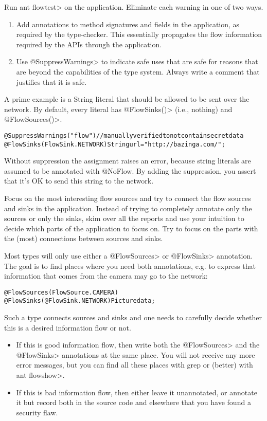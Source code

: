 Run \<ant flowtest> on the application.
Eliminate each warning in one of two ways.
\begin{enumerate}
\item Add annotations to method signatures and fields in the application, as
required by the type-checker. This essentially propagates the flow
information required by the APIs through the application.

\item Use \<@SuppressWarnings> to indicate safe uses that are safe for reasons
that are beyond the capabilities of the type system. Always write a
comment that justifies that it is safe.
\end{enumerate}
A prime example is a String literal that should be allowed to be sent
over the network. By default, every literal has \<@FlowSinks()>
(i.e., nothing) and \<@FlowSources()>.

\begin{alltt}
    @SuppressWarnings("flow") // manually verified to not contain secret data
    @FlowSinks(FlowSink.NETWORK) String url = "http://bazinga.com/";
\end{alltt}

\noindent
Without suppression the assignment raises an error, because string literals
are assumed to be annotated with @NoFlow. By adding the suppression, you
assert that it's OK to send this string to the network. 

Focus on the most interesting flow sources and try to connect the flow
sources and sinks in the application. Instead of trying to completely
annotate only the sources or only the sinks, skim over all the reports
and use your intuition to decide which parts of the application to
focus on. Try to focus on the parts with the (most) connections
between sources and sinks.

Most types will only use either a \<@FlowSources> or \<@FlowSinks>
annotation.
The goal is to find places where you need both annotations, e.g. to
express that information that comes from the camera may go to the
network:

\begin{alltt}
    @FlowSources(FlowSource.CAMERA)
    @FlowSinks(@FlowSink.NETWORK) Picture data;
\end{alltt}

Such a type connects sources and sinks and one needs to carefully
decide whether this is a desired information flow or not.
\begin{itemize}
\item If this is good information flow, then write both the \<@FlowSources>
  and the \<@FlowSinks> annotations at the same place. You will not
  receive any more error messages, but you can find all these places
  with grep or (better) with \<ant flowshow>.
\item If this is bad information flow, then either leave it unannotated,
  or annotate it but record both in the source code and elsewhere that
  you have found a security flaw.
\end{itemize}

